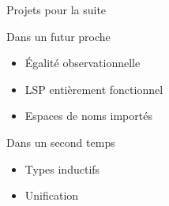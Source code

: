 \documentclass[12pt, aspectratio=169]{beamer}
\begin{document}
        \begin{frame}{Projets pour la suite}
            
            \begin{block}{Dans un futur proche}
                
                \begin{itemize}
                    \item Égalité observationnelle
                    \item LSP entièrement fonctionnel
                    \item Espaces de noms importés
                \end{itemize}

            \end{block} \pause

            \begin{block}{Dans un second temps}
                
                \begin{itemize}
                    \item Types inductifs
                    \item Unification
                \end{itemize}

            \end{block}

        \end{frame}
\end{document}
